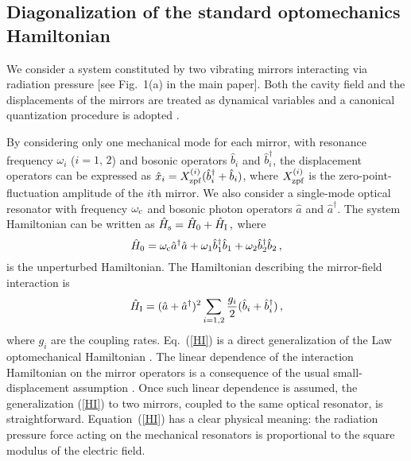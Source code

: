 \documentclass[aps,pra,twocolumn,floatfix,longbibliography, superscriptaddress]{revtex4-1}
\begin{document}


\subsection{Diagonalization of the standard optomechanics Hamiltonian} \label{Subsec:A}
We consider a system constituted by two vibrating mirrors interacting via radiation pressure [see Fig.~1(a) in the main paper].
Both the cavity field and the displacements of the mirrors are treated as dynamical variables and a canonical quantization procedure is adopted \cite{Law1995,Macri2017}.

By considering only one mechanical mode for each mirror, with resonance frequency $\omega_{
	i}$ ($i = 1,\, 2$)  and bosonic operators $\hat b_i$ and $\hat b_i^\dag$, the displacement operators can be expressed as $\hat x_i = X^{(i)}_{\rm zpf} (\hat b_i^\dag + \hat b_i)$, where 
$X^{(i)}_{\rm zpf}$ is the zero-point-fluctuation amplitude of the $i$th mirror.
We also consider a single-mode optical resonator with frequency $\omega_{\rm c}$ and bosonic photon operators $\hat a$ and $\hat a^\dag$. The system Hamiltonian can be written as 
$\hat H_{\rm s} = \hat H_0 + \hat H_{\rm I}\, ,
$
where
\begin{equation}\label{H0}
\hat H_0 =  \omega_{\rm c} \hat a^\dag \hat a +  \omega_{ 1} \hat b^\dag_1 \hat b_1 +   \omega_{2} \hat b^\dag_2 \hat b_2\, ,
\end{equation}
is the unperturbed Hamiltonian. The Hamiltonian describing the mirror-field interaction is
\begin{equation}\label{HI}
\hat H_{\rm I} = (\hat a + \hat a^\dag)^2\sum_{i=1,2} \frac{ g_i}{2} (\hat b_i + \hat b_i^\dag )\, ,
\end{equation}
where $g_i$ are the coupling rates. {Eq.~(\ref{HI}) is a direct generalization of the Law optomechanical Hamiltonian \cite{Law1995}. The linear dependence of the interaction Hamiltonian on the mirror operators is a consequence of the usual small-displacement assumption \cite{Law1995}. Once such linear dependence is assumed, the generalization (\ref{HI}) to two mirrors, coupled to the same optical resonator, is straightforward. Equation~(\ref{HI}) has a clear physical meaning: the radiation pressure force acting on the mechanical resonators is proportional to the square modulus of the electric field.}
\end{document}
